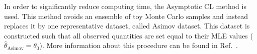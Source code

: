 In order to significantly reduce computing time, the Asymptotic CL method is used. This method  avoids an ensemble of toy Monte Carlo samples and instead replaces it by one representative dataset, called Asimov dataset. This dataset is constructed such that all observed quantities are set equal to their MLE values ($\hat{\theta}_{\mathrm{Asimov}}= \theta_0$). More information about this procedure can be found in Ref.~\cite{Cowan:2010js}.
%
%



